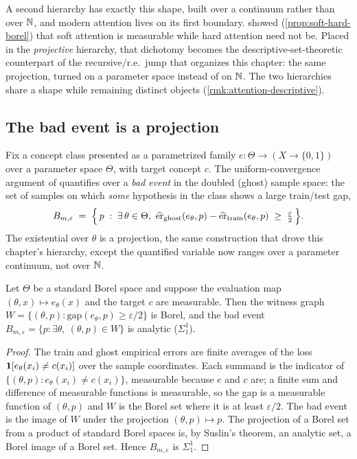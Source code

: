 A second hierarchy has exactly this shape, built over a continuum rather than over $\mathbb{N}$, and modern attention lives on its first boundary.  showed (\cref{prop:soft-hard-borel}) that soft attention is measurable while hard attention need not be. Placed in the \emph{projective} hierarchy, that dichotomy becomes the descriptive-set-theoretic counterpart of the recursive/r.e.\ jump that organizes this chapter: the same projection, turned on a parameter space instead of on $\mathbb{N}$. The two hierarchies share a shape while remaining distinct objects (\cref{rmk:attention-descriptive}).

\subsection{The bad event is a projection}

Fix a concept class presented as a parametrized family $e : \Theta \to (X \to \{0,1\})$ over a parameter space $\Theta$, with target concept $c$. The uniform-convergence argument of  quantifies over a \emph{bad event} in the doubled (ghost) sample space: the set of samples on which \emph{some} hypothesis in the class shows a large train/test gap,
\[
  B_{m,\varepsilon} \;=\; \Bigl\{\,p \;:\; \exists\,\theta\in\Theta,\ \widehat{\mathrm{er}}_{\mathrm{ghost}}(e_\theta,p) - \widehat{\mathrm{er}}_{\mathrm{train}}(e_\theta,p) \;\geq\; \tfrac{\varepsilon}{2}\,\Bigr\}.
\]
The existential over $\theta$ is a projection, the same construction that drove this chapter's hierarchy, except the quantified variable now ranges over a parameter continuum, not over $\mathbb{N}$.

\begin{prop}
\label{prop:attention-analytic}
Let $\Theta$ be a standard Borel space and suppose the evaluation map $(\theta,x)\mapsto e_\theta(x)$ and the target $c$ are measurable. Then the witness graph $W = \{(\theta,p) : \mathrm{gap}(e_\theta,p)\geq \varepsilon/2\}$ is Borel, and the bad event $B_{m,\varepsilon} = \{p : \exists\theta,\ (\theta,p)\in W\}$ is analytic ($\Sigma^1_1$).
\end{prop}

\begin{proof}
The train and ghost empirical errors are finite averages of the loss $\mathbf{1}[e_\theta(x_i)\neq c(x_i)]$ over the sample coordinates. Each summand is the indicator of $\{(\theta,p) : e_\theta(x_i)\neq c(x_i)\}$, measurable because $e$ and $c$ are; a finite sum and difference of measurable functions is measurable, so the gap is a measurable function of $(\theta,p)$ and $W$ is the Borel set where it is at least $\varepsilon/2$. The bad event is the image of $W$ under the projection $(\theta,p)\mapsto p$. The projection of a Borel set from a product of standard Borel spaces is, by Suslin's theorem, an analytic set, a Borel image of a Borel set. Hence $B_{m,\varepsilon}$ is $\Sigma^1_1$.
\end{proof}

